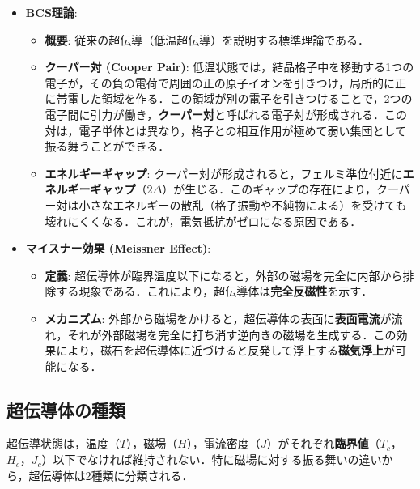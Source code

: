 \documentclass[11pt,a4paper]{ltjsarticle}
\newcommand{\supcite}[1]{\textsuperscript{\cite{#1}}}
\begin{document}
\begin{itemize}
\item \textbf{BCS理論}:
  \begin{itemize}
  \item \textbf{概要}: 従来の超伝導（低温超伝導）を説明する標準理論である．
  \item \textbf{クーパー対 (Cooper Pair)}: 低温状態では，結晶格子中を移動する1つの電子が，その負の電荷で周囲の正の原子イオンを引きつけ，局所的に正に帯電した領域を作る．この領域が別の電子を引きつけることで，2つの電子間に引力が働き，\textbf{クーパー対}と呼ばれる電子対が形成される．この対は，電子単体とは異なり，格子との相互作用が極めて弱い集団として振る舞うことができる\supcite{ref1}．
  \item \textbf{エネルギーギャップ}: クーパー対が形成されると，フェルミ準位付近に\textbf{エネルギーギャップ}（$2\Delta$）が生じる．このギャップの存在により，クーパー対は小さなエネルギーの散乱（格子振動や不純物による）を受けても壊れにくくなる．これが，電気抵抗がゼロになる原因である\supcite{ref1}．
  \end{itemize}

\item \textbf{マイスナー効果 (Meissner Effect)}:
  \begin{itemize}
  \item \textbf{定義}: 超伝導体が臨界温度以下になると，外部の磁場を完全に内部から排除する現象である．これにより，超伝導体は\textbf{完全反磁性}を示す\supcite{ref1}．
  \item \textbf{メカニズム}: 外部から磁場をかけると，超伝導体の表面に\textbf{表面電流}が流れ，それが外部磁場を完全に打ち消す逆向きの磁場を生成する．この効果により，磁石を超伝導体に近づけると反発して浮上する\textbf{磁気浮上}が可能になる\supcite{ref1}．
  \end{itemize}
\end{itemize}

\subsection{超伝導体の種類}

超伝導状態は，温度（$T$），磁場（$H$），電流密度（$J$）がそれぞれ\textbf{臨界値}（$T_c$，$H_c$，$J_c$）以下でなければ維持されない．特に磁場に対する振る舞いの違いから，超伝導体は2種類に分類される\supcite{ref1}．
\end{document}
